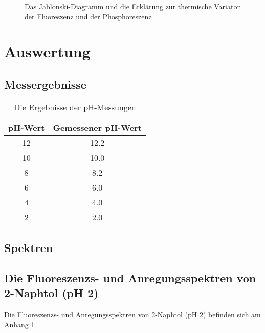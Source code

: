 \documentclass[12pt]{article}
\begin{document}
\begin{figure}

\caption{Das Jablonski-Diagramm und die Erklärung zur thermische Variaton der Fluoreszenz und der Phosphoreszenz} \label{fig:jablonski}
\end{figure}







\section{Auswertung}
\subsection{Messergebnisse}
\begin{table}[!ht]
 \begin{tabular}{cc}
 pH-Wert & Gemessener pH-Wert   \\
\hline
 12 &    12.2    \\
 10 &  10.0 \\
  8 & 8.2  \\
   6 &  6.0 \\
    4 & 4.0  \\
     2 & 2.0  \\
\end{tabular}
  \caption{ Die Ergebnisse der pH-Messungen}
\end{table}
\subsection{Spektren}
\subsection{Die Fluoreszenzs- und Anregungsspektren von 2-Naphtol (pH 2)}
Die Fluoreszenzs- und Anregungsspektren von 2-Naphtol (pH 2) befinden sich am Anhang 1
\end{document}
